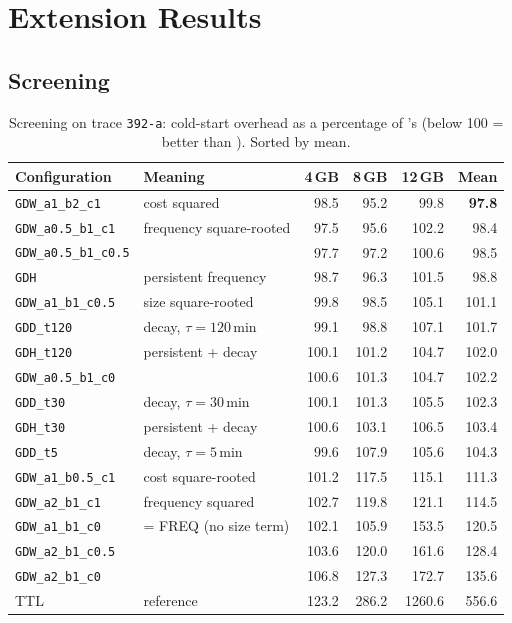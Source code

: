 \documentclass[11pt,a4paper]{article}
\newcommand{\gd}{\text{GD}}
\newcommand{\code}[1]{\texttt{#1}}
\begin{document}
\section{Extension Results}
\label{sec:extresults}

\subsection{Screening}
\begin{table}[H]
\centering
\caption{Screening on trace \code{392-a}: cold-start overhead as a percentage of \gd{}'s
(below 100 = better than \gd{}). Sorted by mean.}
\label{tab:screen}
\small
\begin{tabular}{@{}llrrrr@{}}
\toprule
\textbf{Configuration} & \textbf{Meaning} & \textbf{4\,GB} & \textbf{8\,GB} & \textbf{12\,GB} & \textbf{Mean} \\
\midrule
\code{GDW\_a1\_b2\_c1}     & cost squared              & 98.5  & 95.2  & 99.8  & \textbf{97.8} \\
\code{GDW\_a0.5\_b1\_c1}   & frequency square-rooted   & 97.5  & 95.6  & 102.2 & 98.4 \\
\code{GDW\_a0.5\_b1\_c0.5} &                           & 97.7  & 97.2  & 100.6 & 98.5 \\
\code{GDH}                 & persistent frequency      & 98.7  & 96.3  & 101.5 & 98.8 \\
\code{GDW\_a1\_b1\_c0.5}   & size square-rooted        & 99.8  & 98.5  & 105.1 & 101.1 \\
\code{GDD\_t120}           & decay, $\tau=120$\,min    & 99.1  & 98.8  & 107.1 & 101.7 \\
\code{GDH\_t120}           & persistent + decay        & 100.1 & 101.2 & 104.7 & 102.0 \\
\code{GDW\_a0.5\_b1\_c0}   &                           & 100.6 & 101.3 & 104.7 & 102.2 \\
\code{GDD\_t30}            & decay, $\tau=30$\,min     & 100.1 & 101.3 & 105.5 & 102.3 \\
\code{GDH\_t30}            & persistent + decay        & 100.6 & 103.1 & 106.5 & 103.4 \\
\code{GDD\_t5}             & decay, $\tau=5$\,min      & 99.6  & 107.9 & 105.6 & 104.3 \\
\code{GDW\_a1\_b0.5\_c1}   & cost square-rooted        & 101.2 & 117.5 & 115.1 & 111.3 \\
\code{GDW\_a2\_b1\_c1}     & frequency squared         & 102.7 & 119.8 & 121.1 & 114.5 \\
\code{GDW\_a1\_b1\_c0}     & = FREQ (no size term)     & 102.1 & 105.9 & 153.5 & 120.5 \\
\code{GDW\_a2\_b1\_c0.5}   &                           & 103.6 & 120.0 & 161.6 & 128.4 \\
\code{GDW\_a2\_b1\_c0}     &                           & 106.8 & 127.3 & 172.7 & 135.6 \\
\midrule
TTL                        & reference                 & 123.2 & 286.2 & 1260.6 & 556.6 \\
\bottomrule
\end{tabular}
\end{table}
\end{document}

